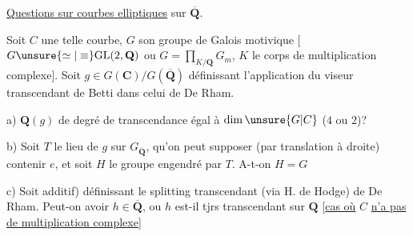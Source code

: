 \uline{Questions sur courbes elliptiques} sur $\overline{\mathbf Q}$.

Soit $C$ une telle courbe, $G$ son groupe de Galois motivique [$G\unsure{\simeq|\equiv}\mathrm{GL}(2,\mathbf Q)$ ou $G=\prod_{K/\mathbf Q}G_m$, $K$ le corps de multiplication complexe]. Soit $g\in G(\mathbf C)/G(\overline{\mathbf Q})$ définissant l'application du viseur transcendant de Betti dans celui de De Rham.

a) $\mathbf Q(g)$ de degré de transcendance égal à $\dim\unsure{G|C}$ ($4$ ou $2$)?

b) Soit $T$ le lieu de $g$ sur $G_{\overline{\mathbf Q}}$,  qu'on peut supposer (par translation à droite) contenir $e$, et soit $H$ le groupe engendré  par $T$.  A-t-on  $H=G$

c) Soit  \inserted{$h\in\mathbf C/\overline{\mathbf Q}$ [quotient} additif) définissant le splitting transcendant (via H. de Hodge) de De Rham. Peut-on avoir $h\in\overline{\mathbf Q}$, ou $h$ est-il tjrs transcendant sur $\mathbf Q$ [\uline{cas où} $C$ \uline{n'a pas de multiplication complexe}]

